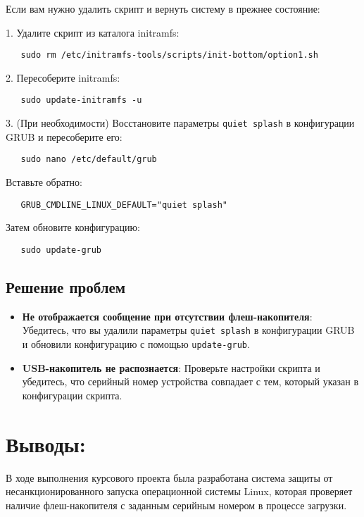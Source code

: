 \documentclass[12pt]{article}
\begin{document}
Если вам нужно удалить скрипт и вернуть систему в прежнее состояние:

1. Удалите скрипт из каталога initramfs:
   \begin{verbatim}
   sudo rm /etc/initramfs-tools/scripts/init-bottom/option1.sh
   \end{verbatim}

2. Пересоберите initramfs:
   \begin{verbatim}
   sudo update-initramfs -u
   \end{verbatim}

3. (При необходимости) Восстановите параметры \texttt{quiet splash} в конфигурации GRUB и пересоберите его:
   \begin{verbatim}
   sudo nano /etc/default/grub
   \end{verbatim}
   Вставьте обратно:
   \begin{verbatim}
   GRUB_CMDLINE_LINUX_DEFAULT="quiet splash"
   \end{verbatim}
   Затем обновите конфигурацию:
   \begin{verbatim}
   sudo update-grub
   \end{verbatim}

\subsection*{Решение проблем}

\begin{itemize}
    \item \textbf{Не отображается сообщение при отсутствии флеш-накопителя}: Убедитесь, что вы удалили параметры \texttt{quiet splash} в конфигурации GRUB и обновили конфигурацию с помощью \texttt{update-grub}.
    \item \textbf{USB-накопитель не распознается}: Проверьте настройки скрипта и убедитесь, что серийный номер устройства совпадает с тем, который указан в конфигурации скрипта.
\end{itemize}

\section*{Выводы:}

В ходе выполнения курсового проекта была разработана система защиты от несанкционированного запуска операционной системы Linux, которая проверяет наличие флеш-накопителя с заданным серийным номером в процессе загрузки. 
\end{document}
